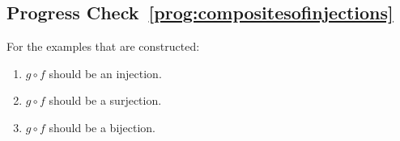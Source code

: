 \subsection*{Progress Check~\ref{prog:compositesofinjections}}
\noindent
For the examples that are constructed:
\begin{enumerate}
\item $g \circ f$  should be an injection.

\item $g \circ f$  should be a surjection.

\item $g \circ f$  should be a bijection.
\end{enumerate}


\hbreak


\endinput

